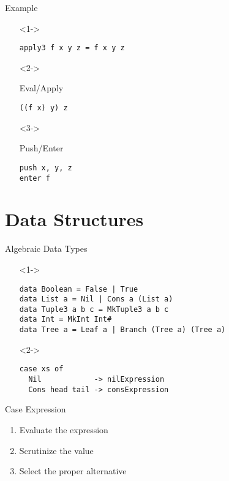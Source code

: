\documentclass{beamer}
\begin{document}
\begin{frame}[fragile]{Example}
  \begin{itemize}
  \item[]<1-> \begin{verbatim}
apply3 f x y z = f x y z
    \end{verbatim}
  \item[]<2-> \begin{block}{Eval/Apply}
      \begin{verbatim}
((f x) y) z
      \end{verbatim}
    \end{block}
  \item[]<3-> \begin{block}{Push/Enter}
      \begin{verbatim}
push x, y, z
enter f
      \end{verbatim}
    \end{block}
  \end{itemize}
\end{frame}

\section{Data Structures}

\begin{frame}[fragile]{Algebraic Data Types}
  \begin{itemize}
  \item[]<1-> \begin{verbatim}
data Boolean = False | True
data List a = Nil | Cons a (List a)
data Tuple3 a b c = MkTuple3 a b c
data Int = MkInt Int#
data Tree a = Leaf a | Branch (Tree a) (Tree a)
    \end{verbatim}
  \item[]<2-> \begin{verbatim}
case xs of
  Nil            -> nilExpression
  Cons head tail -> consExpression
    \end{verbatim}
  \end{itemize}
\end{frame}

\begin{frame}{Case Expression}
  \begin{enumerate}
  \item<1-> Evaluate the expression
  \item<2-> Scrutinize the value
  \item<3-> Select the proper alternative
  \end{enumerate}
\end{frame}
\end{document}
